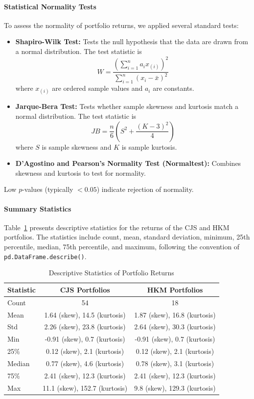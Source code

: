 \documentclass[11pt]{article}
\begin{document}
\paragraph{Statistical Normality Tests}
To assess the normality of portfolio returns, we applied several standard tests:
\begin{itemize}
  \item \textbf{Shapiro-Wilk Test:} Tests the null hypothesis that the data are drawn from a normal distribution. The test statistic is
  \[
  W = \frac{\left( \sum_{i=1}^n a_i x_{(i)} \right)^2}{\sum_{i=1}^n (x_i - \bar{x})^2}
  \]
  where $x_{(i)}$ are ordered sample values and $a_i$ are constants.
  \item \textbf{Jarque-Bera Test:} Tests whether sample skewness and kurtosis match a normal distribution. The test statistic is
  \[
  JB = \frac{n}{6} \left( S^2 + \frac{(K-3)^2}{4} \right)
  \]
  where $S$ is sample skewness and $K$ is sample kurtosis.
  \item \textbf{D'Agostino and Pearson's Normality Test (Normaltest):} Combines skewness and kurtosis to test for normality.
\end{itemize}
Low $p$-values (typically $<0.05$) indicate rejection of normality.

\paragraph{Summary Statistics}
Table~\ref{tab:portfolio_stats} presents descriptive statistics for the returns of the CJS and HKM portfolios. The statistics include count, mean, standard deviation, minimum, 25th percentile, median, 75th percentile, and maximum, following the convention of \texttt{pd.DataFrame.describe()}.

\begin{table}[H]
  \centering
  \caption{Descriptive Statistics of Portfolio Returns}
  \label{tab:portfolio_stats}
  \begin{tabular}{lcc}
    \toprule
    \textbf{Statistic} & \textbf{CJS Portfolios} & \textbf{HKM Portfolios} \\
    \midrule
    Count   & 54                          & 18                          \\
    Mean    & 1.64 (skew), 14.5 (kurtosis)  & 1.87 (skew), 16.8 (kurtosis) \\
    Std     & 2.26 (skew), 23.8 (kurtosis)  & 2.64 (skew), 30.3 (kurtosis) \\
    Min     & -0.91 (skew), 0.7 (kurtosis)  & -0.91 (skew), 0.7 (kurtosis) \\
    25\%    & 0.12 (skew), 2.1 (kurtosis)   & 0.12 (skew), 2.1 (kurtosis) \\
    \rowcolor{blue!20}
    Median  & 0.77 (skew), 4.6 (kurtosis)   & 0.78 (skew), 3.1 (kurtosis) \\
    75\%    & 2.41 (skew), 12.3 (kurtosis)  & 2.41 (skew), 12.3 (kurtosis) \\
    Max     & 11.1 (skew), 152.7 (kurtosis) & 9.8 (skew), 129.3 (kurtosis) \\
    \bottomrule
  \end{tabular}
\end{table}
\end{document}
